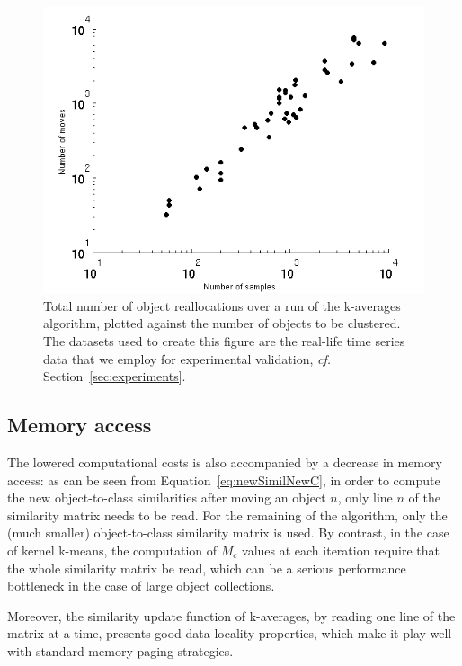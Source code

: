 \documentclass[10pt,journal,compsoc]{IEEEtran}
\begin{document}
\begin{figure}
\center
\includegraphics[width = \columnwidth]{figures/sampleMove.png} 
\caption{Total number of object reallocations over a run of the k-averages algorithm, plotted against the number of objects to be clustered. The datasets used to create this figure are the real-life time series data that we employ for experimental validation, \textit{cf.} Section~\ref{sec:experiments}.}
\label{fig:totalMoved}
\end{figure}

\subsection{Memory access}

The lowered computational costs is also accompanied by a decrease in memory access: as can be seen from Equation~\ref{eq:newSimilNewC}, in order to compute the new object-to-class similarities after moving an object $n$, only line $n$ of the similarity matrix needs to be read. For the remaining of the algorithm, only the (much smaller) object-to-class similarity matrix is used. By contrast, in the case of kernel k-means, the computation of $M_c$ values at each iteration require that the whole similarity matrix be read, which can be a serious performance bottleneck in the case of large object collections.

Moreover, the similarity update function of k-averages, by reading one line of the matrix at a time, presents good data locality properties, which make it play well with standard memory paging strategies.
\end{document}
